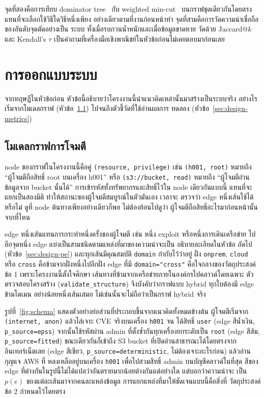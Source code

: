 จุดที่สองคือการเทียบ dominator tree~\cite{lengauer1979} กับ weighted
min-cut~\cite{noel2003} บนกราฟชุดเดียวกันโดยตรง แทนที่จะเลือกใช้วิธีใดวิธีหนึ่งเพียง
อย่างเดียวตามที่งานก่อนหน้าทำ จุดที่สามคือการวัดความน่าเชื่อถือของอันดับจุดตัดอย่างเป็น
ระบบ ทั้งเมื่อรบกวนน้ำหนักและเมื่อข้อมูลขาดหาย วัดด้วย Jaccard@$k$ และ Kendall's
$\tau$ เป็นคำถามที่เครื่องมือเชิงพาณิชย์ในหัวข้อก่อนไม่เคยตอบมาก่อนเลย

\section{การออกแบบระบบ}\label{sec:design}

จากทฤษฎีในหัวข้อก่อน หัวข้อนี้อธิบายว่าโครงงานนี้นำแนวคิดเหล่านั้นมาสร้างเป็นระบบจริง
อย่างไร เริ่มจากโมเดลกราฟ (หัวข้อ~\ref{sec:design-model}) ไปจนถึงตัวชี้วัดที่ใช้อ่านผลการ
ทดลอง (หัวข้อ~\ref{sec:design-metrics})

\subsection{โมเดลกราฟการโจมตี}\label{sec:design-model}

node ของกราฟในโครงงานนี้คือคู่ \texttt{(resource, privilege)} เช่น \texttt{(h001, root)}
หมายถึง ``ผู้โจมตีถือสิทธิ์ root บนเครื่อง h001'' หรือ \texttt{(s3://bucket, read)}
หมายถึง ``ผู้โจมตีอ่านข้อมูลจาก bucket นั้นได้'' การเข้ารหัสทั้งทรัพยากรและสิทธิ์ไว้ใน node
เดียวกันแบบนี้ แทนที่จะแยกเป็นสองมิติ ทำให้สถานะของผู้โจมตีสมบูรณ์ในตัวมันเอง เวลาจะ
ตรวจว่า edge หนึ่งเส้นใช้ได้หรือไม่ ดูที่ node ต้นทางเพียงอย่างเดียวก็พอ ไม่ต้องย้อนไปดูว่า
ผู้โจมตีถือสิทธิ์อะไรมาก่อนหน้านั้นจากที่ไหน

edge หนึ่งเส้นแทนการกระทำหนึ่งครั้งของผู้โจมตี เช่น หนึ่ง exploit หรือหนึ่งการเดินเครือข่าย
ไปอีกจุดหนึ่ง edge แบ่งเป็นสามชนิดตามแหล่งที่มาของความน่าจะเป็น อธิบายละเอียดในหัวข้อ
ถัดไป (หัวข้อ~\ref{sec:design-pe}) และทุกเส้นมีคุณสมบัติ \texttt{domain} กำกับไว้ว่าอยู่
ฝั่ง \texttt{onprem}, \texttt{cloud} หรือ \texttt{cross} คือข้ามจากฝั่งหนึ่งไปอีกฝั่ง edge
ที่มี \texttt{domain="cross"} คือใจกลางของวัตถุประสงค์ข้อ 1 เพราะโครงงานนี้ตั้งใจศึกษา
เส้นทางที่ข้ามจากเครือข่ายภายในองค์กรไปคลาวด์โดยเฉพาะ ตัวตรวจสอบโครงสร้าง
(\texttt{validate\_structure}) จึงบังคับว่ากราฟแบบ hybrid ทุกใบต้องมี edge ข้ามโดเมน
อย่างน้อยหนึ่งเส้นเสมอ ไม่เช่นนั้นจะไม่ถือว่าเป็นกราฟ hybrid จริง

รูปที่~\ref{fig:schema} แสดงตัวอย่างย่อส่วนที่ประกอบขึ้นจากแนวคิดทั้งหมดข้างต้น
ผู้โจมตีเริ่มจาก \texttt{(internet, anon)} แล้วไล่เจาะ CVE จริงบนเครื่อง \texttt{h001} จน
ได้สิทธิ์ \texttt{user} (edge สีน้ำเงิน, \texttt{p\_source=epss}) จากนั้นใช้รหัสผ่าน admin
ที่ตั้งซ้ำกันทุกเครื่องยกระดับเป็น \texttt{root} (edge สีส้ม, \texttt{p\_source=fitted})
ขณะเดียวกันก็เข้าถึง S3 bucket ที่เปิดอ่านสาธารณะได้โดยตรงจากอินเทอร์เน็ตเลย (edge
สีเขียว, \texttt{p\_source=deterministic}, ไม่ต้องเจาะอะไรก่อน) แล้วอ่านกุญแจ AWS ที่
หลงเหลืออยู่บนเครื่อง \texttt{h001} เพื่อไปสวมสิทธิ์ admin บนบัญชีคลาวด์ในที่สุด สีของ
edge ที่ต่างกันในรูปนี้ไม่ได้แปลว่าอันตรายมากน้อยต่างกันแต่อย่างใด แต่บอกว่าความน่าจะ
เป็น $p(e)$ ของแต่ละเส้นมาจากคนละแหล่งข้อมูล การแยกแหล่งที่มาให้ชัดเจนแบบนี้คือสิ่งที่
วัตถุประสงค์ข้อ 2 กำหนดไว้โดยตรง


